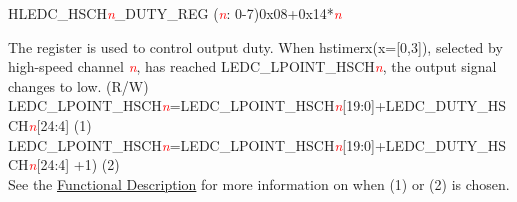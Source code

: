 \begin{register}{H}{LEDC\_HSCH\textcolor{red}{\it{n}}\_DUTY\_REG (\textcolor{red}{\it{n}}: 0-7)}{0x08+0x14*\textcolor{red}{\it{n}}}\label{regdesc:LEDCHSCHnDUTYREG}
%
%
\regnewline%
\begin{regdesc}\begin{reglist}
\item [LEDC\_DUTY\_HSCH\textcolor{red}{\it{n}}]The register is used to control output duty. When hstimerx(x=[0,3]), selected by high-speed channel \textcolor{red}{\it{n}}, has reached LEDC\_LPOINT\_HSCH\textcolor{red}{\it{n}}, the output signal changes to low. (R/W) \\ LEDC\_LPOINT\_HSCH\textcolor{red}{\it{n}}=LEDC\_LPOINT\_HSCH\textcolor{red}{\it{n}}[19:0]+LEDC\_DUTY\_HSCH\textcolor{red}{\it{n}}[24:4] (1) \\LEDC\_LPOINT\_HSCH\textcolor{red}{\it{n}}=LEDC\_LPOINT\_HSCH\textcolor{red}{\it{n}}[19:0]+LEDC\_DUTY\_HSCH\textcolor{red}{\it{n}}[24:4] +1) (2) \\  See the \hyperref[ledcfd:dithering]{Functional Description} for more information on when (1) or (2) is chosen.
\end{reglist}\end{regdesc}
\end{register}


